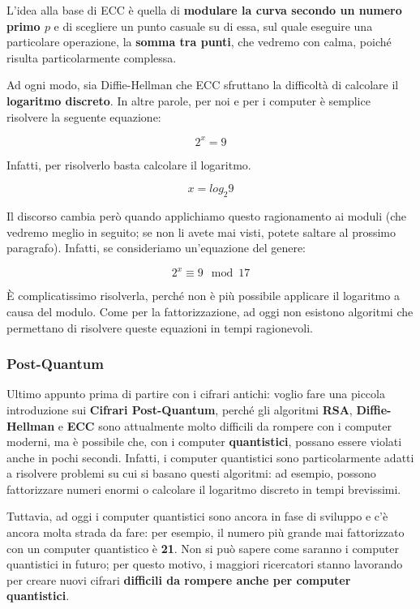 \documentclass{report}
\begin{document}
L'idea alla base di ECC è quella di \textbf{modulare la curva secondo un numero primo $p$} e di scegliere un punto casuale su di essa, sul quale eseguire una particolare operazione, la \textbf{somma tra punti}, che vedremo con calma, poiché risulta particolarmente complessa.

Ad ogni modo, sia Diffie-Hellman che ECC sfruttano la difficoltà di calcolare il \textbf{logaritmo discreto}. In altre parole, per noi e per i computer è semplice risolvere la seguente equazione:

\begin{equation*}
    2 ^ x = 9
\end{equation*}

Infatti, per risolverlo basta calcolare il logaritmo.

\begin{equation*}
    x = log _ {2} 9
\end{equation*}

\newpage

Il discorso cambia però quando applichiamo questo ragionamento ai moduli (che vedremo meglio in seguito; se non li avete mai visti, potete saltare al prossimo paragrafo). Infatti, se consideriamo un’equazione del genere:

\begin{equation*}
    2 ^ x \equiv 9 \mod 17
\end{equation*}


È complicatissimo risolverla, perché non è più possibile applicare il logaritmo a causa del modulo. Come per la fattorizzazione, ad oggi non esistono algoritmi che permettano di risolvere queste equazioni in tempi ragionevoli.


\subsubsection{Post-Quantum}
Ultimo appunto prima di partire con i cifrari antichi: voglio fare una piccola introduzione sui \textbf{Cifrari Post-Quantum}, perché gli algoritmi \textbf{RSA}, \textbf{Diffie-Hellman} e \textbf{ECC} sono attualmente molto difficili da rompere con i computer moderni, ma è possibile che, con i computer \textbf{quantistici}, possano essere violati anche in pochi secondi. Infatti, i computer quantistici sono particolarmente adatti a risolvere problemi su cui si basano questi algoritmi: ad esempio, possono fattorizzare numeri enormi o calcolare il logaritmo discreto in tempi brevissimi.

Tuttavia, ad oggi i computer quantistici sono ancora in fase di sviluppo e c’è ancora molta strada da fare: per esempio, il numero più grande mai fattorizzato con un computer quantistico è \textbf{21}. Non si può sapere come saranno i computer quantistici in futuro; per questo motivo, i maggiori ricercatori stanno lavorando per creare nuovi cifrari \textbf{difficili da rompere anche per computer quantistici}.
\end{document}

